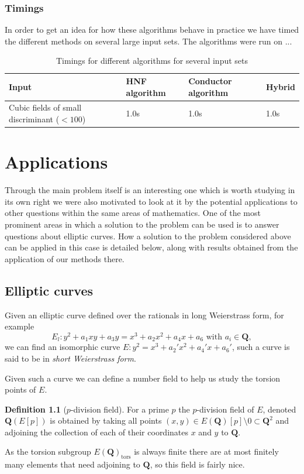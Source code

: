\documentclass[a4paper,abstracton,bibtotoc]{scrreprt}
\theoremstyle{definition}
\newtheorem{defn}{Definition}
\newcommand{\QQ}{\mathbf{Q}}
\begin{document}
\subsection{Timings}
In order to get an idea for how these algorithms behave in practice we have timed the different methods on several large input sets.
The algorithms were run on ...
\begin{table}[h]
\begin{tabular}{|p{14em}|l|l|l|}
\hline
Input & HNF algorithm & Conductor algorithm & Hybrid \\
\hline
Cubic fields of small discriminant ($< 100$) & 1.0s & 1.0s & 1.0s \\
\hline
\end{tabular}
\caption{\label{tab:timings} Timings for different algorithms for several input sets}
\end{table}


\chapter{Applications}

Through the main problem itself is an interesting one which is worth studying in its own right we were also motivated to look at it by the potential applications to other questions within the same areas of mathematics.
One of the most prominent areas in which a solution to the problem can be used is to answer questions about elliptic curves.
How a solution to the problem considered above can be applied in this case is detailed below, along with results obtained from the application of our methods there.

\section{Elliptic curves}
\label{sec:ellapp}
Given an elliptic curve defined over the rationals in long Weierstrass form, for example
\[E_l \colon y^2 + a_1xy + a_3y = x^3 + a_2x^2 + a_4x + a_6\text{ with }a_i \in \QQ,\]
we can find an isomorphic curve $E \colon y^2 = x^3 + a_2'x^2 + a_4'x + a_6'$, such a curve is said to be in \emph{short Weierstrass form}.

Given such a curve we can define a number field to help us study the torsion points of $E$.
\begin{defn}[$p$-division field] %
For a prime $p$ the $p$-division field of $E$, denoted $\QQ(E[p])$ is obtained by taking all points $(x,y) \in E(\QQ)[p]\setminus 0\subset \QQ^2$ and adjoining the collection of each of their coordinates $x$ and $y$ to $\QQ$.
\end{defn}
As the torsion subgroup $E(\QQ)_\text{tors}$ is always finite there are at most finitely many elements that need adjoining to $\QQ$, so this field is fairly nice.
\end{document}
